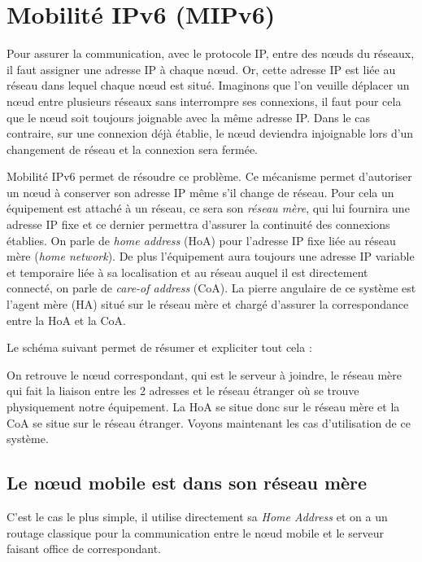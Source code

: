 \section{Mobilité IPv6 (MIPv6)}

Pour assurer la communication, avec le protocole IP, entre des nœuds du réseaux, il faut assigner une adresse IP à chaque nœud.
Or, cette adresse IP est liée au réseau dans lequel chaque nœud est situé.
Imaginons que l'on veuille déplacer un nœud entre plusieurs réseaux sans interrompre ses connexions, il faut pour cela que le nœud soit toujours joignable avec la même adresse IP.
Dans le cas contraire, sur une connexion déjà établie, le nœud deviendra injoignable lors d'un changement de réseau et la connexion sera fermée.

Mobilité IPv6 permet de résoudre ce problème.
Ce mécanisme permet d'autoriser un nœud à conserver son adresse IP même s'il change de réseau.
Pour cela un équipement est attaché à un réseau, ce sera son \emph{réseau mère}, qui lui fournira une adresse IP fixe et ce dernier permettra d’assurer la continuité des connexions établies.
On parle de \emph{home address} (HoA) pour l’adresse IP fixe liée au réseau mère (\emph{home network}).
De plus l’équipement aura toujours une adresse IP variable et temporaire liée à sa localisation et au réseau auquel il est directement connecté, on parle de \emph{care-of address} (CoA).
La pierre angulaire de ce système est l’agent mère (HA) situé sur le réseau mère et chargé d’assurer la correspondance entre la HoA et la CoA.

Le schéma suivant permet de résumer et expliciter tout cela :


On retrouve le nœud correspondant, qui est le serveur à joindre, le réseau mère qui fait la liaison entre les 2 adresses et le réseau étranger où se trouve physiquement notre équipement.
La HoA se situe donc sur le réseau mère et la CoA se situe sur le réseau étranger.
Voyons maintenant les cas d’utilisation de ce système.

\subsection{Le nœud mobile est dans son réseau mère}

C’est le cas le plus simple, il utilise directement sa \emph{Home Address} et on a un routage classique pour la communication entre le nœud mobile et le serveur faisant office de correspondant.


